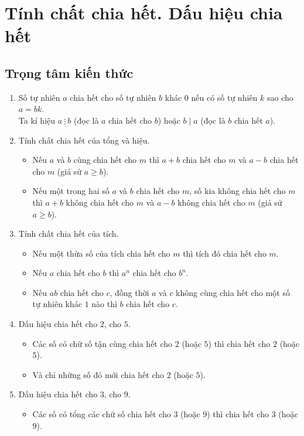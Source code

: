 
\section{Tính chất chia hết. Dấu hiệu chia hết}
\subsection{Trọng tâm kiến thức}
\begin{enumerate}
 \item Số tự nhiên $a$ chia hết cho số tự nhiên $b$ khác $0$ nếu có số tự nhiên $k$ sao cho $a=bk$.\\
 Ta kí hiệu $a\ \vdots\ b$ (đọc là $a$ chia hết cho $b$) hoặc $b \mid a$ (đọc là $b$ chia hết $a$).
 \item Tính chất chia hết của tổng và hiệu.
 \begin{itemize}
  \item Nếu $a$ và $b$ cùng chia hết cho $m$ thì $a+b$ chia hết cho $m$ và $a-b$ chia hết cho $m$ (giả sử $a\geq b$).
  \item Nếu một trong hai số $a$ và $b$ chia hết cho $m$, số kia không chia hết cho $m$ thì $a+b$ không chia hết cho $m$ và $a-b$ không chia hết cho $m$ (giả sử $a\geq b$).
 \end{itemize}
 \item Tính chất chia hết của tích.
 \begin{itemize}
  \item Nếu một thừa số của tích chia hết cho $m$ thì tích đó chia hết cho $m$.
  \item Nếu $a$ chia hết cho $b$ thì $a^n$ chia hết cho $b^n$.
  \item Nếu $ab$ chia hết cho $c$, đồng thời $a$ và $c$ không cùng chia hết cho một số tự nhiên khác $1$ nào thì $b$ chia hết cho $c$.
 \end{itemize}
 \item Dấu hiệu chia hết cho $2$, cho $5$.
 \begin{itemize}
  \item Các số có chữ số tận cùng chia hết cho $2$ (hoặc $5$) thì chia hết cho $2$ (hoặc $5$).
  \item Và chỉ những số đó mới chia hết cho $2$ (hoặc $5$).
 \end{itemize}
 \item Dấu hiệu chia hết cho $3$, cho $9$.
 \begin{itemize}
  \item Các số có tổng các chữ số chia hết cho $3$ (hoặc $9$) thì chia hết cho $3$ (hoặc $9$).

\end{itemize}
\end{enumerate}
